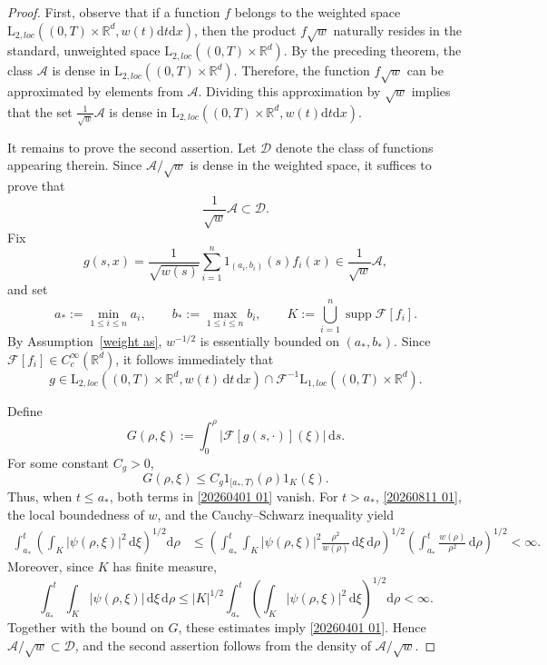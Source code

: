\documentclass[11pt,reqno]{amsart}
\theoremstyle{definition}
\theoremstyle{remark}
\newcommand\bR{\mathbb{R}}
\newcommand\cA{\mathcal{A}}
\newcommand\cF{\mathcal{F}}
\numberwithin{equation}{section}
\begin{document}
\begin{proof}
First, observe that if a function $f$ belongs to the weighted space $\mathrm{L}_{2,loc}\left( (0,T) \times \bR^d, w(t)\mathrm{d}t\mathrm{d}x \right)$, then the product $f \sqrt{w}$ naturally resides in the standard, unweighted space $\mathrm{L}_{2,loc}\left( (0,T) \times \bR^d \right)$.
By the preceding theorem, the class $\cA$ is dense in $\mathrm{L}_{2,loc}\left( (0,T) \times \bR^d \right)$. 
Therefore, the function $f \sqrt{w}$ can be approximated by elements from $\cA$. Dividing this approximation by $\sqrt{w}$ implies that the set $\frac{1}{\sqrt{w}} \cA$ is dense in $\mathrm{L}_{2,loc}\left( (0,T) \times \bR^d, w(t)\mathrm{d}t\mathrm{d}x \right)$.

It remains to prove the second assertion. 
Let $\mathscr{D}$ denote the class of functions appearing therein. 
Since $\cA/\sqrt w$ is dense in the weighted space, it suffices to prove that
$$
\frac{1}{\sqrt w}\cA\subset\mathscr D.
$$
Fix
$$
g(s,x)
=
\frac{1}{\sqrt{w(s)}}
\sum_{i=1}^n1_{(a_i,b_i)}(s)f_i(x)
\in\frac{1}{\sqrt w}\cA,
$$
and set
$$
a_*:=\min_{1\leq i\leq n}a_i,
\qquad
b_*:=\max_{1\leq i\leq n}b_i,
\qquad
K:=\bigcup_{i=1}^n\operatorname{supp}\cF[f_i].
$$
By Assumption~\ref{weight as}, $w^{-1/2}$ is essentially bounded on
$(a_*,b_*)$. Since $\cF[f_i]\in C_c^\infty(\bR^d)$, it follows immediately
that
$$
g\in
\mathrm{L}_{2,loc}\left((0,T)\times\bR^d,w(t)\,\mathrm dt\,\mathrm dx\right)
\cap
\cF^{-1}\mathrm{L}_{1,loc}\left((0,T)\times\bR^d\right).
$$

Define
$$
G(\rho,\xi)
:=
\int_0^\rho
\left|\cF[g(s,\cdot)](\xi)\right|\,\mathrm ds.
$$
For some constant $C_g>0$,
$$
G(\rho,\xi)
\leq
C_g1_{[a_*,T)}(\rho)1_K(\xi).
$$
Thus, when $t\leq a_*$, both terms in \eqref{20260401 01} vanish. For
$t>a_*$, \eqref{20260811 01}, the local boundedness of $w$, and the
Cauchy--Schwarz inequality yield
\begin{align*}
\int_{a_*}^t
\left(
    \int_K|\psi(\rho,\xi)|^2\,\mathrm d\xi
\right)^{1/2}
\mathrm d\rho
&\leq
\left(
    \int_{a_*}^t\int_K
    |\psi(\rho,\xi)|^2\frac{\rho^2}{w(\rho)}
    \,\mathrm d\xi\,\mathrm d\rho
\right)^{1/2}
\left(
    \int_{a_*}^t\frac{w(\rho)}{\rho^2}\,\mathrm d\rho
\right)^{1/2}
<\infty.
\end{align*}
Moreover, since $K$ has finite measure,
$$
\int_{a_*}^t\int_K|\psi(\rho,\xi)|\,\mathrm d\xi\,\mathrm d\rho
\leq
|K|^{1/2}
\int_{a_*}^t
\left(
    \int_K|\psi(\rho,\xi)|^2\,\mathrm d\xi
\right)^{1/2}
\mathrm d\rho
<\infty.
$$
Together with the bound on $G$, these estimates imply \eqref{20260401 01}. 
Hence $\cA/\sqrt w\subset\mathscr D$, and the second assertion follows from the density of $\cA/\sqrt w$.
\end{proof}
\end{document}
